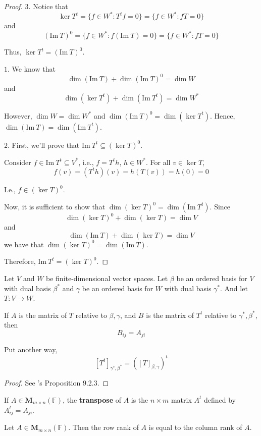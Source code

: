 \begin{proof}
	$3.$ Notice that 
	\[
		\ker T^t = \{ f \in W^\ast : T^t f = 0 \} = \{ f \in W^\ast : fT = 0 \}
	\]
	and
	\[
		(\text{Im}~T)^0 = \{ f \in W^\ast : f(\text{Im}~T) = 0 \} = \{ f \in W^\ast : fT = 0 \}
	\]
	
	Thus, $\ker T^t = (\text{Im}~T)^0$.
	
	$1.$ We know that
	\[
		\dim (\text{Im}~T) + \dim (\text{Im}~T)^0 = \dim W
	\]
	and
	\[
		\dim (\ker T^t) + \dim (\text{Im}~T^t) = \dim W^\ast
	\]
	
	However, $\dim W = \dim W^\ast$ and $\dim (\text{Im}~T)^0 = \dim (\ker T^t)$. Hence, $\dim (\text{Im}~T) = \dim(\text{Im}~T^t)$.
	
	$2.$ First, we'll prove that $\text{Im}~T^t \subseteq (\ker T)^0$.
	
	Consider $f \in \text{Im}~T^t \subseteq V^\ast$, i.e., $f = T^t h$, $h \in W^\ast$. For all $v \in \ker T$,
	\[
		f(v) = (T^t h)(v) = h(T(v)) = h(0) = 0
	\]
	
	I.e., $f \in (\ker T)^0$.
	
	Now, it is sufficient to show that $\dim (\ker T)^0 = \dim (\text{Im}~T^t)$. Since
	\[
		\dim (\ker T)^0 + \dim (\ker T) = \dim V
	\]
	and
	\[
		\dim (\text{Im}~T) + \dim (\ker T) = \dim V
	\]
	we have that $\dim (\ker T)^0 = \dim (\text{Im}~T)$.
	
	Therefore, $\text{Im}~T^t = (\ker T)^0$.
\end{proof}

\begin{theorem}
	Let $V$ and $W$ be finite-dimensional vector spaces. Let $\beta$ be an ordered basis for $V$ with dual basis $\beta^\ast$ and $\gamma$ be an ordered basis for $W$ with dual basis $\gamma^\ast$. And let $T : V \longrightarrow W$.

	If $A$ is the matrix of $T$ relative to $\beta, \gamma$, and $B$ is the matrix of $T^t$ relative to $\gamma^\ast, \beta^\ast$, then 
	\[ 
		B_{ij} = A_{ji}
	\]

	Put another way,
	\[
		[T^t]_{\gamma^\ast, \beta^\ast} = ([T]_{\beta, \gamma})^t
	\]
\end{theorem}

\begin{proof}
	See \cite{mouraGAAL}'s Proposition 9.2.3.
\end{proof}

\begin{definition}[Transpose]
	If $A \in \textbf{M}_{m \times n}(\mathbb{F})$, the \textbf{transpose} of $A$ is the $n \times m$ matrix $A^t$ defined by $A_{ij}^t = A_{ji}$.
\end{definition}

\begin{theorem}
	Let $A \in \textbf{M}_{m \times n}(\mathbb{F})$. Then the row rank of $A$ is equal to the column rank of $A$.
\end{theorem}